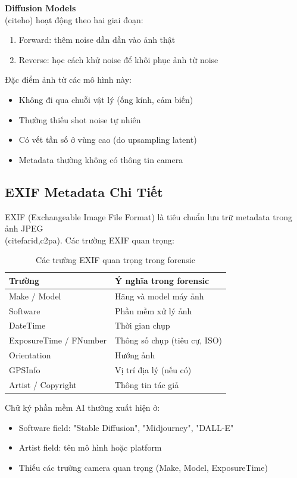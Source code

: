 \textbf{Diffusion Models} \\(cite{ho}) hoạt động theo hai giai đoạn:
\begin{enumerate}
  \item Forward: thêm noise dần dần vào ảnh thật
  \item Reverse: học cách khử noise để khôi phục ảnh từ noise
\end{enumerate}

Đặc điểm ảnh từ các mô hình này:
\begin{itemize}
  \item Không đi qua chuỗi vật lý (ống kính, cảm biến)
  \item Thường thiếu shot noise tự nhiên
  \item Có vết tần số ở vùng cao (do upsampling latent)
  \item Metadata thường không có thông tin camera
\end{itemize}

\subsection{EXIF Metadata Chi Tiết}
EXIF (Exchangeable Image File Format) là tiêu chuẩn lưu trữ metadata trong ảnh JPEG \\(cite{farid,c2pa}). Các trường EXIF quan trọng:

\begin{table}[H]
\centering
\caption{Các trường EXIF quan trọng trong forensic}
\label{tab:exif-fields}
\begin{tabularx}{\textwidth}{p{}Y}
\toprule
\textbf{Trường} & \textbf{Ý nghĩa trong forensic} \\
\midrule
Make / Model & Hãng và model máy ảnh \\
Software & Phần mềm xử lý ảnh \\
DateTime & Thời gian chụp \\
ExposureTime / FNumber & Thông số chụp (tiêu cự, ISO) \\
Orientation & Hướng ảnh \\
GPSInfo & Vị trí địa lý (nếu có) \\
Artist / Copyright & Thông tin tác giả \\
\bottomrule
\end{tabularx}
\end{table}

Chữ ký phần mềm AI thường xuất hiện ở:
\begin{itemize}
  \item Software field: "Stable Diffusion", "Midjourney", "DALL-E"
  \item Artist field: tên mô hình hoặc platform
  \item Thiếu các trường camera quan trọng (Make, Model, ExposureTime)
\end{itemize}

